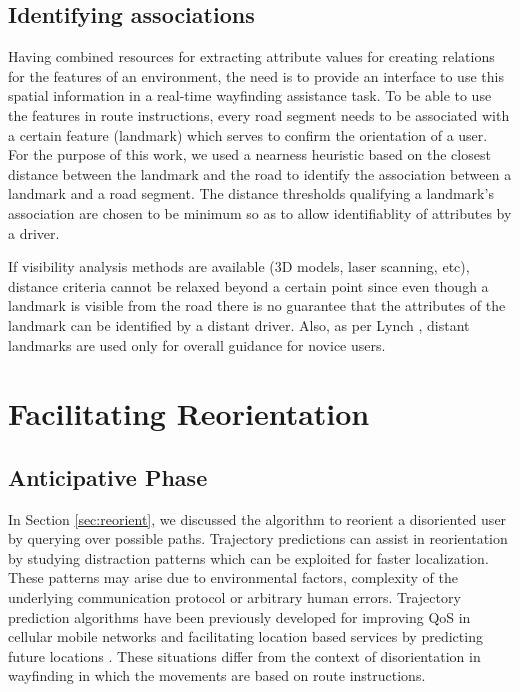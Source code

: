 \documentclass{iitkthesis}
\begin{document}
\subsection{Identifying associations}
Having combined resources for extracting attribute values for creating 
relations for the features of an environment, the need is to provide an 
interface to use this spatial information in a real-time wayfinding 
assistance task. To be able to use the features in route instructions, 
every road segment needs to be associated with a certain feature (landmark) 
which serves to confirm the orientation of a user. For the purpose of 
this work, we used a nearness heuristic based on the closest distance 
between the landmark and the road to identify the association between a 
landmark and a road segment. The distance thresholds qualifying a 
landmark's association are chosen to be minimum so as to allow 
identifiablity of attributes by a driver. 

If visibility analysis methods are available (3D models, laser scanning, 
etc), distance criteria cannot be relaxed beyond a certain point since even
though a landmark is visible from the road there is no guarantee
that the attributes of the landmark can be identified by a 
distant driver. Also, as per Lynch \cite{lynch}, distant landmarks are 
used only for overall guidance for novice users.

\section{Facilitating Reorientation}
\subsection{Anticipative Phase}
\label{sect:anticip}
In Section \ref{sec:reorient}, we discussed the algorithm to reorient a 
disoriented user by querying over possible paths. Trajectory predictions 
can assist in reorientation by studying distraction patterns which can be 
exploited for faster localization. These patterns may arise due to 
environmental factors, complexity of the underlying communication 
protocol or arbitrary human errors. Trajectory prediction algorithms have 
been previously developed for improving QoS in cellular mobile networks 
\cite{kyri} and facilitating location based services by predicting 
future locations \cite{karimi}. These situations differ from the 
context of disorientation in wayfinding in which the movements are 
based on route instructions. 
\end{document}
